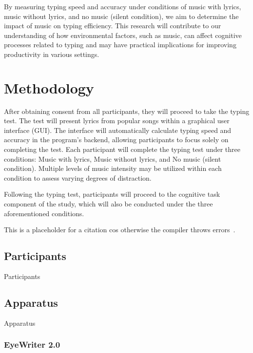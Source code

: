 \documentclass[manuscript, screen]{acmart} %
\begin{document}
By measuring typing speed and accuracy under conditions of music with lyrics, music without lyrics, and no music (silent condition), we aim to determine the impact of music on typing efficiency. This research will contribute to our understanding of how environmental factors, such as music, can affect cognitive processes related to typing and may have practical implications for improving productivity in various settings.


\section{Methodology}
After obtaining consent from all participants, they will proceed to take the typing test. The test will present lyrics from popular songs within a graphical user interface (GUI). The interface will automatically calculate typing speed and accuracy in the program's backend, allowing participants to focus solely on completing the test. Each participant will complete the typing test under three conditions: Music with lyrics, Music without lyrics, and No music (silent condition).
Multiple levels of music intensity may be utilized within each condition to assess varying degrees of distraction.

Following the typing test, participants will proceed to the cognitive task component of the study, which will also be conducted under the three aforementioned conditions. %

This is a placeholder for a citation cos otherwise the compiler throws errors~\cite{AudioDistractionsAshley}.

\subsection[short]{Participants}
Participants

\subsection[short]{Apparatus}
Apparatus
\subsubsection{EyeWriter 2.0}
\end{document}
